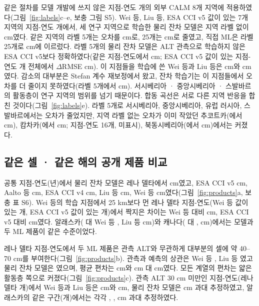 같은 절차를 모델 개발에 쓰지 않은 지점-연도 \nftScoredRows{}개의 외부 CALM 8개 지역에 적용하였다(그림~\ref{fig:labels}c--e, 보충 그림 S5). Wei 등, Liu 등, ESA CCI v5 값이 있는 7개 지역의 지점-연도 \nftrows{}개에서, 세 연구 지역으로 학습한 물리 잔차 모델은 지역 라벨 없이 \nftAllRszero{} cm였다. 같은 지역의 라벨 5개는 오차를 \nftAllRsfive{} cm로, 25개는 \nftAllRstwfive{} cm로 줄였고, 직접 ML은 라벨 25개로 \nftAllDstwfive{} cm에 이르렀다. 라벨 5개의 물리 잔차 모델은 ALT 관측으로 학습하지 않은 ESA CCI v5보다 정확하였다(같은 지점-연도에서 \nftAllCcifivezero{} cm; ESA CCI v5 값이 있는 지점-연도 \nftdCciRows{}개 전체에서 $\Delta$RMSE \nftdRsCcifivefive{} cm). 이 지점들을 학습에 쓴 Wei 등과 Liu 등은 \nftAllWeizero{} cm와 \nftAllLiuzero{} cm였다. 감소의 대부분은 Stefan 계수 재보정에서 왔고, 잔차 학습기는 이 지점들에서 오차를 더 줄이지 못하였다(라벨 5개에서 \nftdRsPnfive{} cm). 서시베리아 · 중앙시베리아 · 스발바르의 활동층이 연구 지역의 범위를 넘기 때문이다. 합동 곡선은 서로 다른 지역 반응을 합친 것이다(그림~\ref{fig:labels}e). 라벨 5개로 서시베리아, 중앙시베리아, 유럽 러시아, 스발바르에서는 오차가 줄었지만, 지역 라벨 없는 오차가 이미 작았던 추코트카(\nftChRszero{}에서 \nftChRsfive{} cm), 캄차카(\nftKaRszero{}에서 \nftKaRsfive{} cm; 지점-연도 16개, 미표시), 북동시베리아(\nftNsRszero{}에서 \nftNsRsfive{} cm)에서는 커졌다.

\subsection{같은 셀 · 같은 해의 공개 제품 비교}
공통 지점-연도(\nyrscc{}년)에서 물리 잔차 모델은 레나 델타에서 \nccLeRoall{} cm였고, ESA CCI v5 \nccLeCcifiveall{} cm, Aalto 등 \nccLeAaltoall{} cm, ESA CCI v4 \nccLeCcifourall{} cm, Liu 등 \nccLeLiuall{} cm, Wei 등 \nccLeWeiall{} cm였다(그림~\ref{fig:products}a, 보충 표 S6). Wei 등의 학습 지점에서 25 km보다 먼 레나 델타 지점-연도(Wei 등 값이 있는 \nnprodLeweimask{}개, ESA CCI v5 값이 있는 \nnprodLeccifivemask{}개)에서 짝지은 차이는 Wei 등 대비 \ndprodLeweiRomask{} cm, ESA CCI v5 대비 \ndprodLeccifiveRomask{} cm였다. 알래스카(\nccAkRoall{} 대 Wei 등 \nccAkWeiall, Liu 등 \nccAkLiuall{} cm)와 캐나다(\nccCaRoall{} 대 \nccCaWeiall, \nccCaLiuall{} cm)에서는 모델과 두 ML 제품이 같은 수준이었다.

레나 델타 지점-연도에서 두 ML 제품은 관측 ALT와 무관하게 대부분의 셀에 약 40--70 cm를 부여한다(그림~\ref{fig:products}b). 관측과 예측의 상관은 Wei 등 \nrLeWei, Liu 등 \nrLeLiu{}였고 물리 잔차 모델은 \nrLeRo{}였으며, 평균 편차는 \nbiasLeAllWei{} cm와 \nbiasLeAllLiu{} cm 대 \nbiasLeAllRo{} cm였다. 모든 계열의 편차는 얇은 활동층 쪽으로 커졌다(그림~\ref{fig:products}c). 관측 ALT 30 cm 미만인 지점-연도(레나 델타 \nthinNLe{}개)에서 Wei 등과 Liu 등은 \nbiasLeThinWei{} cm와 \nbiasLeThinLiu{} cm, 물리 잔차 모델은 \nbiasLeThinRo{} cm 과대 추정하였고, 알래스카의 같은 구간(\nthinNAk{}개)에서는 각각 \nbiasAkThinWei, \nbiasAkThinLiu, \nbiasAkThinRo{} cm 과대 추정하였다.

